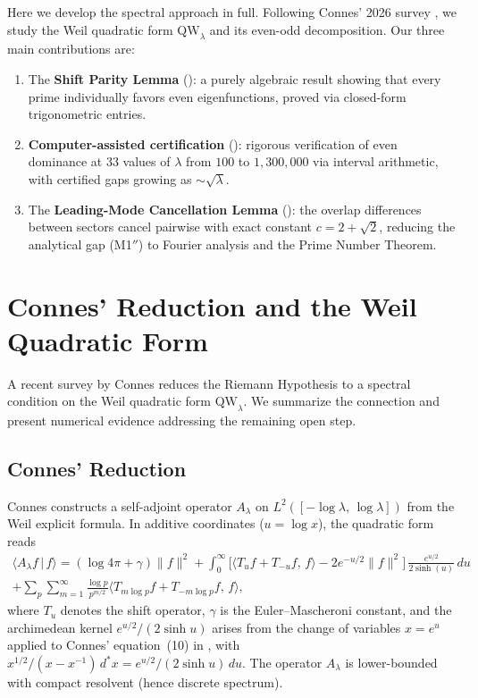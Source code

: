 \documentclass[12pt,a4paper]{article}
\theoremstyle{definition}
\theoremstyle{remark}
\begin{document}
Here we develop the spectral approach in full. Following Connes' 2026 survey \cite{Connes2025}, we study the Weil quadratic form $\mathrm{QW}_\lambda$ and its even-odd decomposition. Our three main contributions are:
\begin{enumerate}
  \item The \textbf{Shift Parity Lemma} (): a purely algebraic result showing that every prime individually favors even eigenfunctions, proved via closed-form trigonometric entries.
  \item \textbf{Computer-assisted certification} (): rigorous verification of even dominance at $33$ values of $\lambda$ from $100$ to $1{,}300{,}000$ via interval arithmetic, with certified gaps growing as $\sim\!\sqrt{\lambda}$.
  \item The \textbf{Leading-Mode Cancellation Lemma} (): the overlap differences between sectors cancel pairwise with exact constant $c = 2 + \sqrt{2}$, reducing the analytical gap (M1$''$) to Fourier analysis and the Prime Number Theorem.
\end{enumerate}


\section{Connes' Reduction and the Weil Quadratic Form}
\label{sec:connes}

A recent survey by Connes \cite{Connes2025} reduces the Riemann Hypothesis to a spectral condition on the Weil quadratic form $\mathrm{QW}_\lambda$. We summarize the connection and present numerical evidence addressing the remaining open step.

\subsection{Connes' Reduction}

Connes constructs a self-adjoint operator $A_\lambda$ on $L^2([-\log\lambda,\,\log\lambda])$ from the Weil explicit formula. In additive coordinates ($u = \log x$), the quadratic form reads
\begin{multline*}
  \langle A_\lambda f \,|\, f \rangle = (\log 4\pi + \gamma)\|f\|^2
  + \int_0^\infty \Big[\langle T_u f + T_{-u} f,\, f \rangle - 2e^{-u/2}\|f\|^2\Big]\,\frac{e^{u/2}}{2\sinh(u)}\,du \\
  + \sum_p \sum_{m=1}^\infty \frac{\log p}{p^{m/2}} \langle T_{m\log p} f + T_{-m\log p} f,\, f \rangle,
\end{multline*}
where $T_u$ denotes the shift operator, $\gamma$ is the Euler--Mascheroni constant, and the archimedean kernel $e^{u/2}/(2\sinh u)$ arises from the change of variables $x = e^u$ applied to Connes' equation~(10) in \cite{Connes2025}, with $x^{1/2}/(x-x^{-1})\,d^*\!x = e^{u/2}/(2\sinh u)\,du$. The operator $A_\lambda$ is lower-bounded with compact resolvent (hence discrete spectrum).
\end{document}
